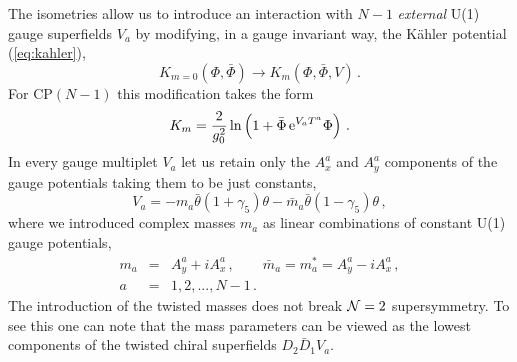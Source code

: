 \documentclass[epsfig,12pt]{article}
\def\beq{\begin{equation}}
\def\beqn{\begin{eqnarray}}
\def\eeqn{\end{eqnarray}}
\def\beqn{\begin{eqnarray}}
\def\eeqn{\end{eqnarray}}
\def\beq{\begin{equation}}
\begin{document}
The isometries allow us  to introduce an interaction with $N-1$ {\em external} 
U(1) gauge 
superfields $V_{a}$ by modifying, in a gauge invariant way,  the K\"ahler potential (\ref{eq:kahler}),
\begin{equation}
\label{eq:mkahler}
K_{m=0}(\Phi, \bar\Phi)\to
K_{m}(\Phi, \bar\Phi,V)\,.
\end{equation}
For CP$(N\!-\!1)$ this modification takes the form
\begin{equation}
\label{eq:mkahlerp}
K_{m}=\frac{2}{g_{0}^{2}}\ln \left(1+\bar\Phi\,{\rm e}^{V_{a}T^{a}}\Phi\right)\,.
\end{equation}
In every gauge multiplet $V_{a}$ let us retain only the $A^{a}_{x}$ and $A^{a}_{y}$ 
components of the gauge potentials taking them to be just constants,
\beq
V_{a}=-m_{a}\bar \theta(1+\gamma_{5})\theta -\bar m_{a}\bar \theta(1-\gamma_{5})\theta\,,
\label{wtpi1}
\end{equation}
where we introduced complex masses  $m_{a}$ as linear combinations of 
constant U(1) gauge potentials,
\beqn
m_{a}
&=&
A^{a}_{y}+iA^{a}_{x}\,,\qquad \bar m_{a}=m_{a}^{*}=A^{a}_{y}-iA^{a}_{x}\,,
\nonumber\\[2mm]
a 
&=&
 1,2, ..., N-1\,.
\label{wtpi2}
\eeqn
The introduction of the twisted masses does not 
break ${\cal N}=2$ supersymmetry.  To see this one can note that the mass parameters 
can be viewed as the lowest components of the twisted chiral superfields
$D_{2}\bar D_{1}V_{a}$.
\end{document}
